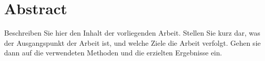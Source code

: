 \chapter*{Abstract}


Beschreiben Sie hier den Inhalt der vorliegenden Arbeit. Stellen Sie
kurz dar, was der Ausgangspunkt der Arbeit ist, und welche Ziele die
Arbeit verfolgt. Gehen sie dann auf die verwendeten Methoden und die
erzielten Ergebnisse ein.
